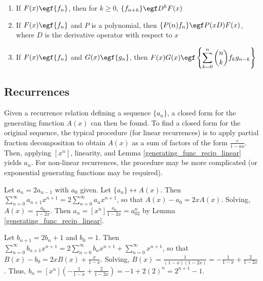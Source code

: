 \documentclass[a4paper]{article}
\begin{document}
\begin{theorem}\label{wilf_egf}
\;
\begin{enumerate}[label=\Roman*.]
\item If $F(x)\egf \{f_n\}$, then for $k\geq0$, $\displaystyle\{f_{n+k}\}\egf D^kF(x)$
\item If $F(x)\egf \{f_n\}$ and $P$ is a polynomial, then $\{P(n)f_n\}\egf  P(xD)F(x)$, where $D$ is the derivative operator with respect to $x$
\item If $F(x)\egf \{f_n\}$ and $G(x)\egf \{g_n\}$, then $\displaystyle F(x)G(x)\egf \left\{\sum_{k=0}^n\binom nkf_kg_{n-k}\right\}$
\end{enumerate}
\end{theorem}

\subsection{Recurrences}

\begin{concept}
Given a recurrence relation defining a sequence $\{a_n\}$, a closed form for the generating function $A(x)$ can then be found. To find a closed form for the original sequence, the typical procedure (for linear recurrences) is to apply partial fraction decomposition to obtain $A(x)$ as a sum of factors of the form $\frac{c}{1-ax}$. Then, applying $[x^n]$, linearity, and Lemma \ref{generating_func_recip_linear} yields $a_n$. For non-linear recurrences, the procedure may be more complicated (or exponential generating functions may be required).
\end{concept}

\begin{example}
Let $a_n=2a_{n-1}$ with $a_0$ given. Let $\{a_n\}\longleftrightarrow A(x)$. Then $\sum_{n=0}^\infty a_{n+1}x^{n+1}=2\sum_{n=0}^\infty a_nx^{n+1}$, so that $A(x)-a_0=2xA(x)$. Solving, $A(x)=\frac{a_0}{1-2x}$. Then $a_n=[x^n]\frac{a_0}{1-2x}=a_02^n$ by Lemma \ref{generating_func_recip_linear}.
\end{example}

\begin{example}
Let $b_{n+1}=2b_n+1$ and $b_0=1$. Then $\sum_{n=0}^\infty b_{n+1}x^{n+1}=2\sum_{n=0}^\infty b_nx^{n+1}+\sum_{n=0}^\infty x^{n+1}$, so that $B(x)-b_0=2xB(x)+\frac x{1-x}$. Solving, $B(x)=\frac1{(1-x)(1-2x)}=-\frac1{1-x}+\frac2{1-2x}$. Thus, $b_n=[x^n]\left(-\frac1{1-x}+\frac2{1-2x}\right)=-1+2(2)^n=2^{n+1}-1$.
\end{example}
\end{document}
